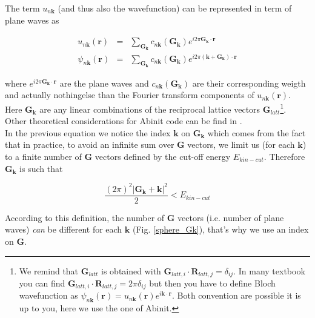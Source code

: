 \documentclass[a4paper,12pt]{report}
\begin{document}
The term $u_{n\mathbf{k}}$ (and thus also the wavefunction) can be represented in term of plane waves as

\begin{eqnarray}
u_{n\mathbf{k}}(\mathbf{r}) &=& \sum_{\mathbf{G_{\mathbf{k}}}} c_{n\mathbf{k}}(\mathbf{G}_{\mathbf{k}}) e^{i2\pi \mathbf{G}_{\mathbf{k}}\cdotp\mathbf{r}} \\
\psi_{n\mathbf{k}}(\mathbf{r}) &=& \sum_{\mathbf{G_{\mathbf{k}}}} c_{n\mathbf{k}}(\mathbf{G}_{\mathbf{k}}) e^{i2\pi \left(  \mathbf{k} +\mathbf{G}_{\mathbf{k}}\right) \cdotp\mathbf{r}}
\end{eqnarray}

where $e^{i2\pi\mathbf{G}_{\mathbf{k}}\cdotp\mathbf{r}}$ are the plane waves and $c_{n\mathbf{k}}(\mathbf{G}_{\mathbf{k}})$ are their corresponding weigth and actually nothingelse than the Fourier transform components of $u_{n\mathbf{k}}(\mathbf{r})$. Here $\mathbf{G_{\mathbf{k}}}$ are any linear combinations of the reciprocal lattice vectors $\mathbf{G}_{latt}$\footnote{We remind that $\mathbf{G}_{latt}$ is obtained with $\mathbf{G}_{latt,i}\cdotp\mathbf{R}_{latt,j} = \delta_{ij}$. In many textbook you can find $\mathbf{G}_{latt,i}\cdotp\mathbf{R}_{latt,j} = 2\pi \delta_{ij}$ but then you have to define Bloch wavefunction as $\psi_{n\mathbf{k}}(\mathbf{r}) = u_{n\mathbf{k}}(\mathbf{r}) e^{i\mathbf{k}\cdotp\mathbf{r}}$. Both convention are possible it is up to you, here we use the one of Abinit.}. Other theoretical considerations  for Abinit code can be find in \cite{doc1WF_gonze}.\\
In the previous equation we notice the index $\mathbf{k}$ on $\mathbf{G_{\mathbf{k}}}$ which comes from the fact that in practice, to avoid an infinite sum over $\mathbf{G}$ vectors, we limit us (for each $\mathbf{k}$) to a finite number of $\mathbf{G}$ vectors defined by the cut-off energy $E_{kin-cut}$. Therefore $\mathbf{G}_{\mathbf{k}}$ is such that

\begin{equation}
\frac{(2\pi)^2 \vert \mathbf{G}_{\mathbf{k}}+\mathbf{k} \vert^2}{2} < E_{kin-cut} \label{Ecutsphere}
\end{equation}

According to this definition, the number of $\mathbf{G}$ vectors (i.e. number of plane waves) \textit{can} be different for each $\mathbf{k}$ (Fig. \ref{sphere_Gk}), that's why we use an index on $\mathbf{G}$.
\end{document}
